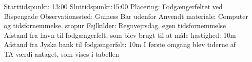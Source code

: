 Starttidspunkt: 13:00
Sluttidspunkt:15:00
Placering: Fodgængerfeltet ved Bispengade
Observationssted: Guiness Bar udenfor
Anvendt materiale: Computer og tidsfornemmelse, stopur
Fejlkilder: Regnvejrsdag, egen tidsfornemmelse
Afstand fra havn til fodgængerfelt, som blev brugt til at måle hastighed: 10m
Afstand fra Jyske bank til fodgængerfelt: 10m
I første omgang blev tiderne af TA-værdi antaget, som vises i tabellen %

